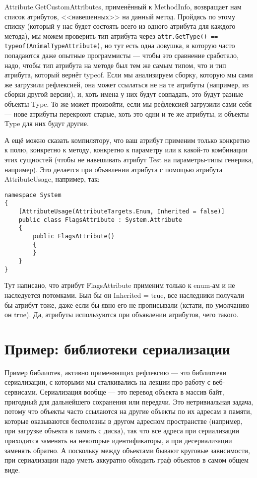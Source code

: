 \documentclass[a5paper]{article}
\begin{document}
Attribute.GetCustomAttributes, применённый к MethodInfo, возвращает нам список атрибутов, <<навешенных>> на данный метод. Пройдясь по этому списку (который у нас будет состоять всего из одного атрибута для каждого метода), мы можем проверить тип атрибута через \texttt{attr.GetType() == typeof(AnimalTypeAttribute)}, но тут есть одна ловушка, в которую часто попадаются даже опытные программисты --- чтобы это сравнение сработало, надо, чтобы тип атрибута на методе был тем же самым типом, что и тип атрибута, который вернёт typeof. Если мы анализируем сборку, которую мы сами же загрузили рефлексией, она может ссылаться не на те атрибуты (например, из сборки другой версии), и, хоть имена у них будут совпадать, это будут разные объекты Type. То же может произойти, если мы рефлексией загрузили сами себя --- нове атрибуты перекроют старые, хоть это одни и те же атрибуты, и объекты Type для них будут другие.

А ещё можно сказать компилятору, что ваш атрибут применим только конкретно к полю, конкретно к методу, конкретно к параметру или к какой-то комбинации этих сущностей (чтобы не навешивать атрибут Test на параметры-типы генерика, например). Это делается при объявлении атрибута с помощью атрибута AttributeUsage, например, так:

\begin{verbatim}
namespace System 
{
    [AttributeUsage(AttributeTargets.Enum, Inherited = false)]
    public class FlagsAttribute : System.Attribute
    {
        public FlagsAttribute()
        {
        }
    }
}
\end{verbatim}

Тут написано, что атрибут FlagsAttribute применим только к enum-ам и не наследуется потомками. Был бы он Inherited = true, все наследники получали бы атрибут тоже, даже если бы явно его не прописывали (кстати, по умолчанию он true). Да, атрибуты используются при объявлении атрибутов, чего такого.

\section{Пример: библиотеки сериализации}

Пример библиотек, активно применяющих рефлексию --- это библиотеки сериализации, с которыми мы сталкивались на лекции про работу с веб-сервисами. Сериализация вообще --- это перевод объекта в массив байт, пригодный для дальнейшего сохранения или передачи. Это нетривиальная задача, потому что объекты часто ссылаются на другие объекты по их адресам в памяти, которые оказываются бесполезны в другом адресном пространстве (например, при загрузке объекта в память с диска), так что все адреса при сериализации приходится заменять на некоторые идентификаторы, а при десериализации заменять обратно. А поскольку между объектами бывают круговые зависимости, при сериализации надо уметь аккуратно обходить граф объектов в самом общем виде.
\end{document}
